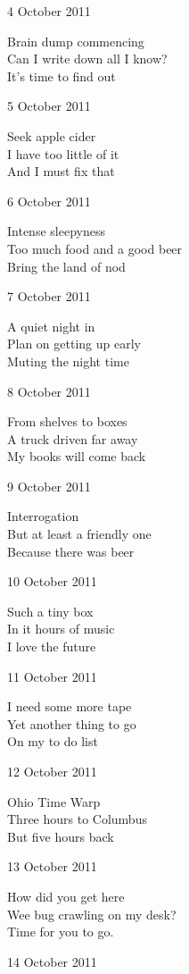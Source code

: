 \documentclass[12pt]{article}
\begin{document}
\newpage

4 October 2011

Brain dump commencing \\
Can I write down all I know? \\
It's time to find out

5 October 2011

Seek apple cider \\
I have too little of it \\
And I must fix that

6 October 2011

Intense sleepyness \\
Too much food and a good beer \\
Bring the land of nod

7 October 2011

A quiet night in \\
Plan on getting up early \\
Muting the night time

8 October 2011

From shelves to boxes \\
A truck driven far away \\
My books will come back

9 October 2011

Interrogation \\
But at least a friendly one \\
Because there was beer

10 October 2011

Such a tiny box \\
In it hours of music \\
I love the future

\newpage

11 October 2011

I need some more tape \\
Yet another thing to go \\
On my to do list

12 October 2011

Ohio Time Warp \\
Three hours to Columbus \\
But five hours back

13 October 2011

How did you get here \\
Wee bug crawling on my desk? \\
Time for you to go.

14 October 2011
\end{document}
